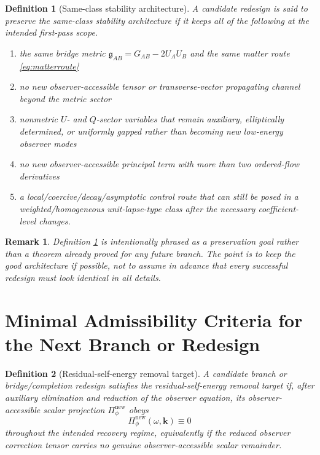 \documentclass[11pt]{article}
\newcommand{\BridgeMetric}{\mathfrak{g}}
\newtheorem{definition}{Definition}
\newtheorem{remark}{Remark}
\begin{document}
\begin{definition}[Same-class stability architecture]
\label{def:sameclass}
A candidate redesign is said to preserve the \emph{same-class stability architecture} if it keeps all of the following at the intended first-pass scope.
\begin{enumerate}
    \item the same bridge metric \(\BridgeMetric_{AB}=G_{AB}-2U_AU_B\) and the same matter route \eqref{eq:matterroute}
    \item no new observer-accessible tensor or transverse-vector propagating channel beyond the metric sector
    \item nonmetric \(U\)- and \(Q\)-sector variables that remain auxiliary, elliptically determined, or uniformly gapped rather than becoming new low-energy observer modes
    \item no new observer-accessible principal term with more than two ordered-flow derivatives
    \item a local/coercive/decay/asymptotic control route that can still be posed in a weighted/homogeneous unit-lapse-type class after the necessary coefficient-level changes.
\end{enumerate}
\end{definition}

\begin{remark}
Definition \ref{def:sameclass} is intentionally phrased as a preservation goal rather than a theorem already proved for any future branch. The point is to keep the good architecture if possible, not to assume in advance that every successful redesign must look identical in all details.
\end{remark}

\section{Minimal Admissibility Criteria for the Next Branch or Redesign}

\begin{definition}[Residual-self-energy removal target]
\label{def:removal}
A candidate branch or bridge/completion redesign satisfies the \emph{residual-self-energy removal target} if, after auxiliary elimination and reduction of the observer equation, its observer-accessible scalar projection \(\Pi_\phi^{\mathrm{new}}\) obeys
\begin{equation}
\Pi_\phi^{\mathrm{new}}(\omega,\mathbf{k})\equiv 0
\label{eq:target}
\end{equation}
throughout the intended recovery regime, equivalently if the reduced observer correction tensor carries no genuine observer-accessible scalar remainder.
\end{definition}
\end{document}
